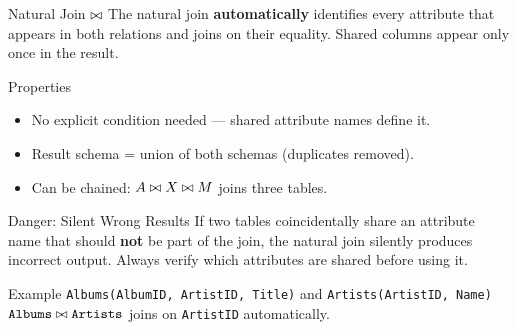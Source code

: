 \begin{frame}{Natural Join $\bowtie$}
  The natural join \textbf{automatically} identifies every attribute that
  appears in both relations and joins on their equality.  Shared columns appear
  only once in the result.

  \begin{block}{Properties}
    \begin{itemize}
      \item No explicit condition needed --- shared attribute names define it.
      \item Result schema = union of both schemas (duplicates removed).
      \item Can be chained: $A \bowtie X \bowtie M$ joins three tables.
    \end{itemize}
  \end{block}

  \begin{alertblock}{Danger: Silent Wrong Results}
    If two tables coincidentally share an attribute name that should
    \textbf{not} be part of the join, the natural join silently produces
    incorrect output.  Always verify which attributes are shared before using it.
  \end{alertblock}

  \begin{examples}{Example}
    \texttt{Albums(AlbumID, ArtistID, Title)} and
    \texttt{Artists(ArtistID, Name)}\\
    $\texttt{Albums} \bowtie \texttt{Artists}$ joins on \texttt{ArtistID}
    automatically.
  \end{examples}
\end{frame}

